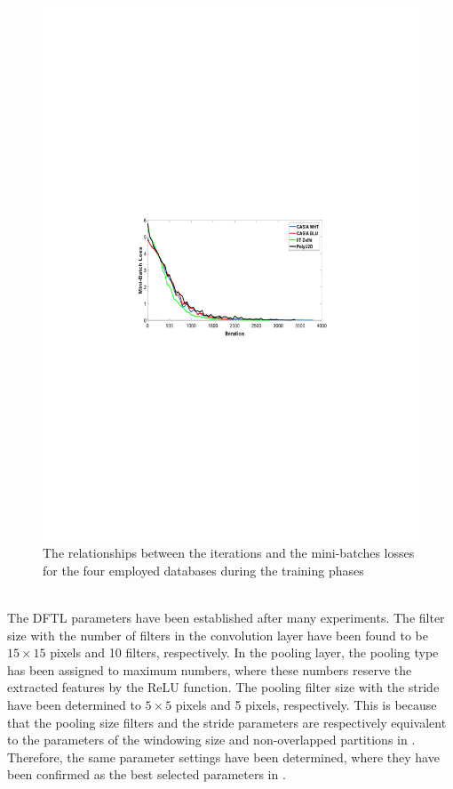\documentclass[conference]{IEEEtran}
\begin{document}
\begin{figure}[!b]
    \centering
    \includegraphics[page=1,scale=.8,trim=5cm 11.25cm 5cm 11.25cm,clip]{Iteration_vs_Loss_All_Databases.pdf}
    \caption{The relationships between the iterations and the mini-batches losses for the four employed databases during the training phases}
    \label{fig:Training_curves}
\end{figure}\\
The DFTL parameters have been established after many experiments. The filter size with the number of filters in the convolution layer have been found to be $15 \times 15$ pixels and 10 filters, respectively. In the pooling layer, the pooling type has been assigned to maximum numbers, where these numbers reserve the extracted features by the ReLU function. The pooling filter size with the stride have been determined to $5 \times 5$ pixels and 5 pixels, respectively. This is because that the pooling size filters and the stride parameters are respectively equivalent to the parameters of the windowing size and non-overlapped partitions in \cite{Al-Nima2015Human} \cite{Al-Nima2017Robust} \cite{Al-Nima2017efficient} \cite{Al-Nima2017finger}. Therefore, the same parameter settings have been determined, where they have been confirmed as the best selected parameters in \cite{Al-Nima2017Signal}.
\end{document}
